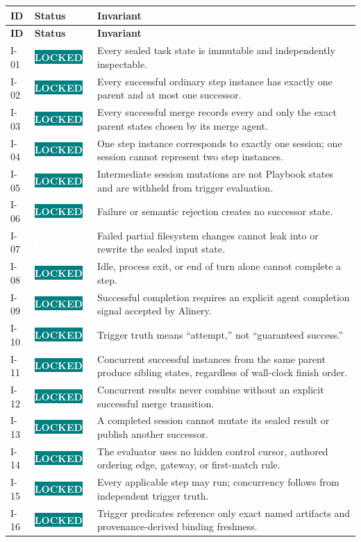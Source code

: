 \documentclass[11pt]{article}
\newcommand{\statuspill}[2]{%
  \begingroup\setlength{\fboxsep}{3pt}%
  \colorbox{#1}{\textcolor{white}{\sffamily\bfseries\scriptsize #2}}%
  \endgroup}
\newcommand{\Locked}{\statuspill{Teal}{LOCKED}}
\newcommand{\Derived}{\statuspill{Accent}{DERIVED}}
\begin{document}
\begin{longtable}{@{}L{0.52in}L{0.88in}L{5.10in}@{}}
\toprule
\textbf{ID} & \textbf{Status} & \textbf{Invariant} \\
\midrule
\endfirsthead
\toprule
\textbf{ID} & \textbf{Status} & \textbf{Invariant} \\
\midrule
\endhead
I-01 & \Locked & Every sealed task state is immutable and independently inspectable. \\
I-02 & \Locked & Every successful ordinary step instance has exactly one parent and at most one successor. \\
I-03 & \Locked & Every successful merge records every and only the exact parent states chosen by its merge agent. \\
I-04 & \Locked & One step instance corresponds to exactly one session; one session cannot represent two step instances. \\
I-05 & \Locked & Intermediate session mutations are not Playbook states and are withheld from trigger evaluation. \\
I-06 & \Locked & Failure or semantic rejection creates no successor state. \\
I-07 & \Derived & Failed partial filesystem changes cannot leak into or rewrite the sealed input state. \\
I-08 & \Locked & Idle, process exit, or end of turn alone cannot complete a step. \\
I-09 & \Locked & Successful completion requires an explicit agent completion signal accepted by Alinery. \\
I-10 & \Locked & Trigger truth means ``attempt,'' not ``guaranteed success.'' \\
I-11 & \Locked & Concurrent successful instances from the same parent produce sibling states, regardless of wall-clock finish order. \\
I-12 & \Locked & Concurrent results never combine without an explicit successful merge transition. \\
I-13 & \Locked & A completed session cannot mutate its sealed result or publish another successor. \\
I-14 & \Locked & The evaluator uses no hidden control cursor, authored ordering edge, gateway, or first-match rule. \\
I-15 & \Locked & Every applicable step may run; concurrency follows from independent trigger truth. \\
I-16 & \Locked & Trigger predicates reference only exact named artifacts and provenance-derived binding freshness. \\

\end{longtable}
\end{document}
